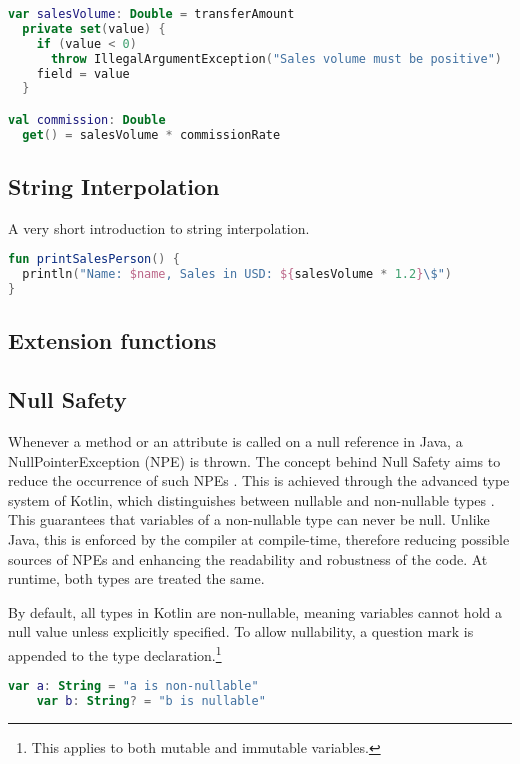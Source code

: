 \documentclass[a4paper, 11pt]{article}
\begin{document}
\begin{lstlisting}[language=Kotlin,title={Kotlin Properties}]
var salesVolume: Double = transferAmount
  private set(value) {
    if (value < 0)
      throw IllegalArgumentException("Sales volume must be positive")
    field = value
  }

val commission: Double
  get() = salesVolume * commissionRate
\end{lstlisting}

\subsection{String Interpolation}
A very short introduction to string interpolation.

\begin{lstlisting}[language=Kotlin,title={String Interpolation}]
fun printSalesPerson() {
  println("Name: $name, Sales in USD: ${salesVolume * 1.2}\$")
}
\end{lstlisting}

\subsection{Extension functions}

\subsection{Null Safety}
  Whenever a method or an attribute is called on a null reference in Java, a NullPointerException (NPE) is thrown. The concept behind Null Safety aims to reduce the occurrence of such NPEs \cite{nullsafety}. This is achieved through the advanced type system of Kotlin, which distinguishes between nullable and non-nullable types \cite{nullsafety-nullable-types}. This guarantees that variables of a non-nullable type can never be null. Unlike Java, this is enforced by the compiler at compile-time, therefore reducing possible sources of NPEs and enhancing the readability and robustness of the code. At runtime, both types are treated the same.
  
  By default, all types in Kotlin are non-nullable, meaning variables cannot hold a null value unless explicitly specified. To allow nullability, a question mark is appended to the type declaration.\footnote{This applies to both mutable and immutable variables.}

  \begin{lstlisting}[language=Kotlin]
    var a: String = "a is non-nullable"
    var b: String? = "b is nullable"
  \end{lstlisting}
  
\end{document}
